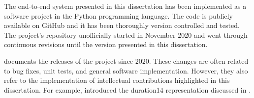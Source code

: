 
The end-to-end system presented in this dissertation has
been implemented as a software project in the Python
programming language. The code is publicly available on
GitHub and it has been thoroughly version controlled and
tested. The project's repository unofficially started in
November 2020 and went through continuous revisions until
the version presented in this dissertation.

 documents the releases of the
project since 2020. These changes are often related to bug
fixes, unit tests, and general software implementation.
However, they also refer to the implementation of
intellectual contributions highlighted in this dissertation.
For example,  introduced the \gls{duration14}
representation discussed in
.
